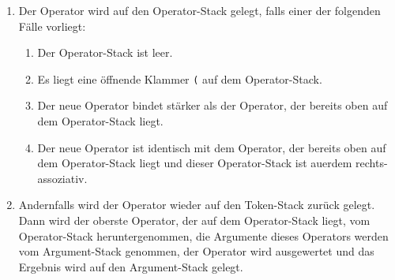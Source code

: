 \begin{enumerate}
\item Der Operator wird auf den Operator-Stack gelegt, falls einer der folgenden F\"alle
      vorliegt:
      \begin{enumerate}
      \item Der Operator-Stack ist leer.
      \item Es liegt eine \"offnende Klammer \texttt{(}
            auf dem Operator-Stack.
      \item Der neue Operator bindet st\"arker als der Operator, der bereits oben auf dem Operator-Stack liegt.
      \item Der neue Operator ist identisch mit dem Operator, der bereits oben auf dem Operator-Stack
            liegt und dieser Operator-Stack ist au\3erdem rechts-assoziativ.
        
      \end{enumerate}
\item Andernfalls wird der Operator wieder auf den Token-Stack zur\"uck gelegt.
      Dann wird der oberste Operator, der auf dem Operator-Stack liegt,
      vom Operator-Stack heruntergenommen, die Argumente  dieses Operators werden vom
      Argument-Stack genommen, der Operator wird ausgewertet
      und das Ergebnis wird auf den Argument-Stack gelegt.
\end{enumerate}

